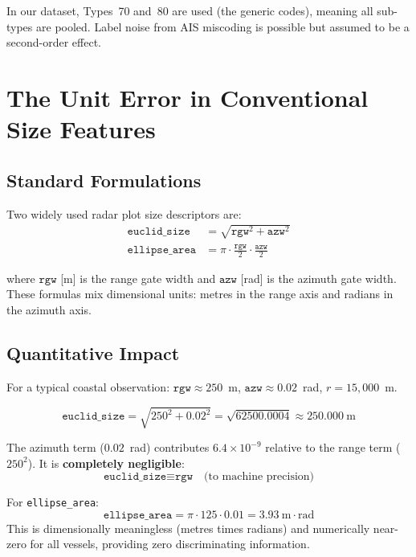 \documentclass[journal]{IEEEtran}
\begin{document}
In our dataset, Types~70 and~80 are used (the generic codes), meaning all
sub-types are pooled. Label noise from AIS miscoding is possible but assumed
to be a second-order effect.

\section{The Unit Error in Conventional Size Features}
\label{sec:unit_error}

\subsection{Standard Formulations}

Two widely used radar plot size descriptors are:
\begin{align}
  \texttt{euclid\_size} &= \sqrt{\texttt{rgw}^2 + \texttt{azw}^2}
  \label{eq:euclid_wrong}\\
  \texttt{ellipse\_area} &= \pi \cdot \frac{\texttt{rgw}}{2} \cdot \frac{\texttt{azw}}{2}
  \label{eq:ellipse_wrong}
\end{align}

where $\texttt{rgw}$ [m] is the range gate width and $\texttt{azw}$ [rad] is
the azimuth gate width. These formulas mix dimensional units: metres in the
range axis and radians in the azimuth axis.

\subsection{Quantitative Impact}

For a typical coastal observation:
$\texttt{rgw} \approx 250$~m, $\texttt{azw} \approx 0.02$~rad, $r = 15{,}000$~m.

\begin{equation}
  \texttt{euclid\_size} = \sqrt{250^2 + 0.02^2} = \sqrt{62500.0004} \approx 250.000~\text{m}
\end{equation}

The azimuth term ($0.02$~rad) contributes $6.4 \times 10^{-9}$ relative to the
range term ($250^2$). It is \textbf{completely negligible}:
\begin{equation}
  \texttt{euclid\_size} \equiv \texttt{rgw} \quad \text{(to machine precision)}
\end{equation}

For \texttt{ellipse\_area}:
\begin{equation}
  \texttt{ellipse\_area} = \pi \cdot 125 \cdot 0.01 = 3.93~\text{m}\cdot\text{rad}
\end{equation}
This is dimensionally meaningless (metres times radians) and numerically near-zero
for all vessels, providing zero discriminating information.
\end{document}
